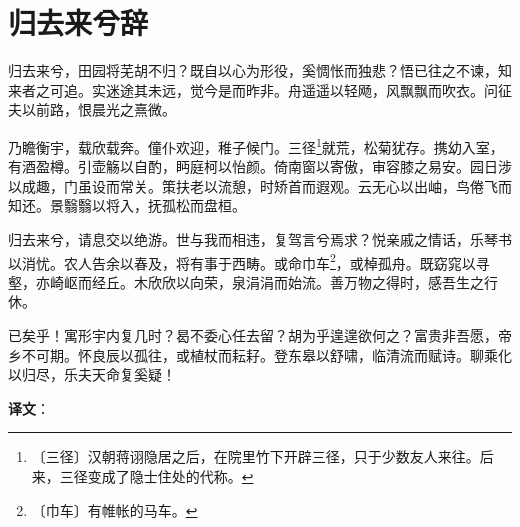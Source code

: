 \documentclass[12pt,UTF-8,openany,a4]{ctexbook}
\begin{document}
\chapter{归去来兮辞}

\begin{large}
    
    归去来兮，田园将芜胡不归？既自以心为形役，奚惆怅而独悲？悟已往之不谏，知来者之可追。实迷途其未远，觉今是而昨非。舟遥遥以轻飏，风飘飘而吹衣。问征夫以前路，恨晨光之熹微。
    
    乃瞻衡宇，载欣载奔。僮仆欢迎，稚子候门。三径\footnote{〔三径〕\yiwen 汉朝蒋诩隐居之后，在院里竹下开辟三径，只于少数友人来往。后来，三径变成了隐士住处的代称。}就荒，松菊犹存。携幼入室，有酒盈樽。引壶觞以自酌，眄庭柯以怡颜。倚南窗以寄傲，审容膝之易安。园日涉以成趣，门虽设而常关。策扶老以流憩，时矫首而遐观。云无心以出岫，鸟倦飞而知还。景翳翳以将入，抚孤松而盘桓。
    
    归去来兮，请息交以绝游。世与我而相违，复驾言兮焉求？悦亲戚之情话，乐琴书以消忧。农人告余以春及，将有事于西畴。或命巾车\footnote{〔巾车〕\yiwen 有帷帐的马车。}，或棹孤舟。既窈窕以寻壑，亦崎岖而经丘。木欣欣以向荣，泉涓涓而始流。善万物之得时，感吾生之行休。
    
    已矣乎！寓形宇内复几时？曷不委心任去留？胡为乎遑遑欲何之？富贵非吾愿，帝乡不可期。怀良辰以孤往，或植杖而耘耔。登东皋以舒啸，临清流而赋诗。聊乘化以归尽，乐夫天命复奚疑！

\end{large}


\newpage

\begin{Large}
   \noindent \textbf{译文}：
\end{Large}

\vspace{1em}
\end{document}

